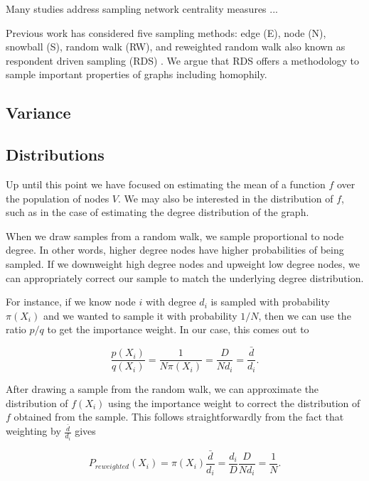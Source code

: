 \documentclass[a4paper]{article}
\begin{document}
Many studies address sampling network centrality measures ... \cite{}

Previous work has considered five sampling methods: edge (E), node (N), snowball (S), random walk (RW), and reweighted random walk also known as respondent driven sampling (RDS) \cite{wagner_sampling_2017,wang_sampling_2015,heckathorn_respondent-driven_2002}. We argue that RDS offers a methodology to sample important properties of graphs including homophily.




\subsection{Variance}

\subsection{Distributions}

Up until this point we have focused on estimating the mean of a function $f$ over the population of nodes $V$. We may also be interested in the distribution of $f$, such as in the case of estimating the degree distribution of the graph.

When we draw samples from a random walk, we sample proportional to node degree. In other words, higher degree nodes have higher probabilities of being sampled. If we downweight high degree nodes and upweight low degree nodes, we can appropriately correct our sample to match the underlying degree distribution.

For instance, if we know node $i$ with degree $d_i$ is sampled with probability $\pi(X_i)$ and we wanted to sample it with probability $1/N$, then we can use the ratio $p/q$ to get the importance weight. In our case, this comes out to

\begin{equation}
\frac{p(X_i)}{q(X_i)} = \frac{1}{N \pi(X_i)} = \frac{D}{N d_i} = \frac{\bar{d}}{d_i}.
\end{equation}

After drawing a sample from the random walk, we can approximate the distribution of $f(X_i)$ using the importance weight to correct the distribution of $f$ obtained from the sample. This follows straightforwardly from the fact that weighting by $\frac{\bar{d}}{d_i}$ gives

\begin{equation}
P_{reweighted}(X_i) = \pi(X_i) \frac{\bar{d}}{d_i} = \frac{d_i}{D} \frac{D}{N d_i} = \frac{1}{N}.
\end{equation}
\end{document}
